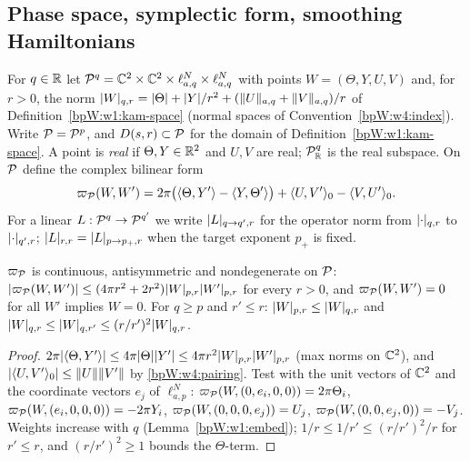 \subsection{Phase space, symplectic form, smoothing Hamiltonians}\label{bpW:w5:setting-sec}

\begin{definition}\label{bpW:w5:setting}
For $q\in\mathbb{R}$ let $\mathcal P^q=\mathbb{C}^2\times\mathbb{C}^2\times\ell^N_{a,q}\times\ell^N_{a,q}$ with points $W=(\Theta,Y,U,V)$ and, for
$r>0$, the norm $\lvert W\rvert_{q,r}=\lvert \Theta\rvert+\lvert Y\rvert/r^2+(\lVert U\rVert_{a,q}+\lVert V\rVert_{a,q})/r$ of
Definition~\ref{bpW:w1:kam-space} (normal spaces of Convention~\ref{bpW:w4:index}). Write $\mathcal P=\mathcal P^p$, and
$D(s,r)\subset\mathcal P$ for the domain of Definition~\ref{bpW:w1:kam-space}. A point is \emph{real} if
$\Theta,Y\in\mathbb{R}^2$ and $U,V$ are real; $\mathcal P^q_{\mathbb{R}}$ is the real subspace. On $\mathcal P$ define the complex bilinear form
\[\varpi_{\mathcal P}(W,W')=2\pi\bigl(\langle\Theta,Y'\rangle-\langle Y,\Theta'\rangle\bigr)+\langle U,V'\rangle_0-\langle V,U'\rangle_0.\]
For a linear $L:\mathcal P^q\to\mathcal P^{q'}$ we write $\lvert L\rvert_{q\to q',r}$ for the operator norm from $\lvert \cdot\rvert_{q,r}$ to
$\lvert \cdot\rvert_{q',r}$; $\lvert L\rvert_{r,r}=\lvert L\rvert_{p\to p_+,r}$ when the target exponent $p_+$ is fixed.
\end{definition}

\begin{lemma}\label{bpW:w5:omega}
$\varpi_{\mathcal P}$ is continuous, antisymmetric and nondegenerate on $\mathcal P$: $\lvert \varpi_{\mathcal P}(W,W')\rvert\le(4\pi r^2+2r^2)\lvert W\rvert_{p,r}\lvert W'\rvert_{p,r}$
for every $r>0$, and $\varpi_{\mathcal P}(W,W')=0$ for all $W'$ implies $W=0$. For $q\ge p$ and $r'\le r$:
$\lvert W\rvert_{p,r}\le\lvert W\rvert_{q,r}$ and $\lvert W\rvert_{q,r}\le\lvert W\rvert_{q,r'}\le(r/r')^2\lvert W\rvert_{q,r}$.
\end{lemma}
\begin{proof}
\label{stepW:w5:ombd} $2\pi\lvert \langle\Theta,Y'\rangle\rvert\le4\pi\lvert \Theta\rvert\lvert Y'\rvert\le4\pi r^2\lvert W\rvert_{p,r}\lvert W'\rvert_{p,r}$
(max norms on $\mathbb{C}^2$), and $\lvert \langle U,V'\rangle_0\rvert\le\lVert U\rVert\lVert V'\rVert$ by \eqref{bpW:w4:pairing}.
\label{stepW:w5:omnd} Test with the unit vectors of $\mathbb{C}^2$ and the coordinate vectors
$e_j$ of $\ell^N_{a,p}$: $\varpi_{\mathcal P}(W,(0,e_i,0,0))=2\pi\Theta_i$, $\varpi_{\mathcal P}(W,(e_i,0,0,0))=-2\pi Y_i$,
$\varpi_{\mathcal P}(W,(0,0,0,e_j))=U_j$, $\varpi_{\mathcal P}(W,(0,0,e_j,0))=-V_j$.
\label{stepW:w5:omnorm} Weights increase with $q$ (Lemma~\ref{bpW:w1:embed}); $1/r\le1/r'\le(r/r')^2/r$
for $r'\le r$, and $(r/r')^2\ge1$ bounds the $\Theta$-term.
\end{proof}


